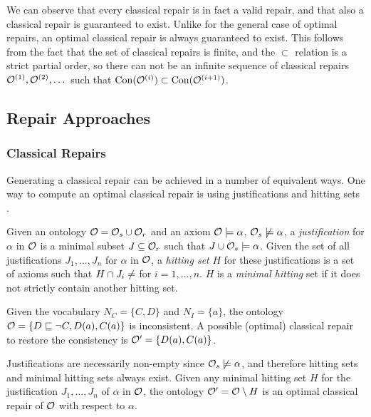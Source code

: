 We can observe that every classical repair is in fact a valid repair, and that also a classical repair is guaranteed to exist. Unlike for the general case of optimal repairs, an optimal classical repair is always guaranteed to exist. This follows from the fact that the set of classical repairs is finite, and the $\subset$ relation is a strict partial order, so there can not be an infinite sequence of classical repairs $\mathcal{O}^{(1)}, \mathcal{O}^{(2)}, \dots$  such that $\operatorname{Con}(\mathcal{O}^{(i)}) \subset \operatorname{Con}(\mathcal{O}^{(i + 1)})$.

\subsection{Repair Approaches} \label{repair-approaches}

\subsubsection{Classical Repairs} \label{classical-repairs}

Generating a classical repair can be achieved in a number of equivalent ways. One way to compute an optimal classical repair is using justifications and hitting sets \cite{reiter1987theory}.

\begin{definition}
  Given an ontology $\mathcal{O} = \mathcal{O}_s \cup \mathcal{O}_r$ and an axiom $\mathcal{O} \models \alpha$, $\mathcal{O}_s \not\models \alpha$, a \emph{justification} for $\alpha$ in $\mathcal{O}$ is a minimal subset $J \subseteq \mathcal{O}_r$ such that $J \cup \mathcal{O}_s \models \alpha$. Given the set of all justifications $J_1, \dots, J_n$ for $\alpha$ in $\mathcal{O}$, a \emph{hitting set} $H$ for these justifications is a set of axioms such that $H \cap J_i \not= \empty$ for $i = 1, \dots, n$. $H$ is a \emph{minimal hitting} set if it does not strictly contain another hitting set.
\end{definition}

\begin{example}
  Given the vocabulary $N_C = \{ C, D \}$ and $N_I = \{ a \}$, the ontology $\mathcal{O} = \{ D \sqsubseteq \lnot C, D(a), C(a) \}$ is inconsistent. A possible (optimal) classical repair to restore the consistency is $\mathcal{O}' = \{ D(a), C(a) \}$.
\end{example}

Justifications are necessarily non-empty since $\mathcal{O}_s \not\models \alpha$, and therefore hitting sets and minimal hitting sets always exist. Given any minimal hitting set $H$ for the justification $J_1, \dots, J_n$ of $\alpha$ in $\mathcal{O}$, the ontology $\mathcal{O}' = \mathcal{O} \setminus H$ is an optimal classical repair of $\mathcal{O}$ with respect to $\alpha$.

